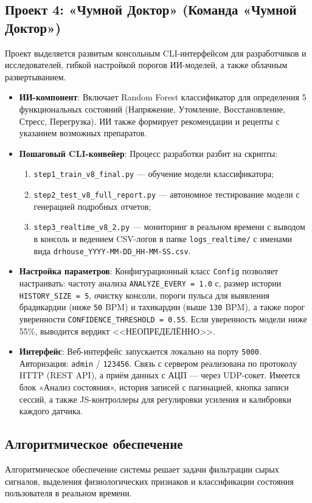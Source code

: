 \documentclass[utf8, russian]{eskdtext}
\begin{document}
\subsection{Проект 4: «Чумной Доктор» (Команда «Чумной Доктор»)}
Проект выделяется развитым консольным CLI-интерфейсом для разработчиков и исследователей, гибкой настройкой порогов ИИ-моделей, а также облачным развертыванием.
\begin{itemize}
    \item \textbf{ИИ-компонент}: Включает Random Forest классификатор для определения 5 функциональных состояний (Напряжение, Утомление, Восстановление, Стресс, Перегрузка). ИИ также формирует рекомендации и рецепты с указанием возможных препаратов.
    \item \textbf{Пошаговый CLI-конвейер}: Процесс разработки разбит на скрипты:
          \begin{enumerate}
              \item \texttt{step1\_train\_v8\_final.py} --- обучение модели классификатора;
              \item \texttt{step2\_test\_v8\_full\_report.py} --- автономное тестирование модели с генерацией подробных отчетов;
              \item \texttt{step3\_realtime\_v8\_2.py} --- мониторинг в реальном времени с выводом в консоль и ведением CSV-логов в папке \texttt{logs\_realtime/} с именами вида \texttt{drhouse\_YYYY-MM-DD\_HH-MM-SS.csv}.
          \end{enumerate}
    \item \textbf{Настройка параметров}: Конфигурационный класс \texttt{Config} позволяет настраивать: частоту анализа \texttt{ANALYZE\_EVERY = 1.0} с, размер истории \texttt{HISTORY\_SIZE = 5}, очистку консоли, пороги пульса для выявления брадикардии (ниже \texttt{50} BPM) и тахикардии (выше \texttt{130} BPM), а также порог уверенности \texttt{CONFIDENCE\_THRESHOLD = 0.55}. Если уверенность модели ниже 55\%, выводится вердикт <<НЕОПРЕДЕЛЁННО>>.
    \item \textbf{Интерфейс}: Веб-интерфейс запускается локально на порту \texttt{5000}. Авторизация: \texttt{admin} / \texttt{123456}. Связь с сервером реализована по протоколу HTTP (REST API), а приём данных с АЦП — через UDP-сокет. Имеется блок «Анализ состояния», история записей с пагинацией, кнопка записи сессий, а также JS-контроллеры для регулировки усиления и калибровки каждого датчика.
\end{itemize}

\subsection{Алгоритмическое обеспечение}
Алгоритмическое обеспечение системы решает задачи фильтрации сырых сигналов, выделения физиологических признаков и классификации состояния пользователя в реальном времени.
\end{document}
